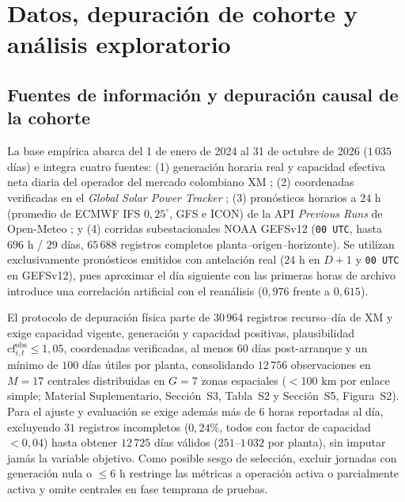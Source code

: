 \section{Datos, depuración de cohorte y análisis exploratorio}\label{sec:datos_eda}

\subsection{Fuentes de información y depuración causal de la cohorte}

La base empírica abarca del 1 de enero de 2024 al 31 de octubre de 2026 ($1\,035$ días) e integra cuatro fuentes: (1) generación horaria real y capacidad efectiva neta diaria del operador del mercado colombiano XM \cite{xm2026api}; (2) coordenadas verificadas en el \textit{Global Solar Power Tracker} \cite{gem2026solar}; (3) pronósticos horarios a $24\text{ h}$ (promedio de ECMWF IFS $0{,}25^\circ$, GFS e ICON) de la API \textit{Previous Runs} de Open-Meteo \cite{openmeteoPreviousRuns}; y (4) corridas subestacionales NOAA GEFSv12 (\texttt{00~UTC}, hasta $696\text{ h}$ / $29$ días, $65\,688$ registros completos planta--origen--horizonte). Se utilizan exclusivamente pronósticos emitidos con antelación real ($24\text{ h}$ en $D+1$ y \texttt{00~UTC} en GEFSv12), pues aproximar el día siguiente con las primeras horas de archivo introduce una correlación artificial con el reanálisis ($0{,}976$ frente a $0{,}615$).

El protocolo de depuración física \cite{nist2003eda,pipino2002quality,jensen2024solarqc} parte de $30\,964$ registros recurso--día de XM y exige capacidad vigente, generación y capacidad positivas, plausibilidad $\mathrm{cf}^{\mathrm{obs}}_{i,t} \le 1{,}05$, coordenadas verificadas, al menos $60$ días post-arranque y un mínimo de $100$ días útiles por planta, consolidando $12\,756$ observaciones en $M=17$ centrales distribuidas en $G=7$ zonas espaciales ($<100\text{ km}$ por enlace simple; Material Suplementario, Sección~S3, Tabla~S2 y Sección~S5, Figura~S2). Para el ajuste y evaluación se exige además más de $6$ horas reportadas al día, excluyendo $31$ registros incompletos ($0{,}24\%$, todos con factor de capacidad $< 0{,}04$) hasta obtener $12\,725$ días válidos ($251$--$1\,032$ por planta), sin imputar jamás la variable objetivo. Como posible sesgo de selección, excluir jornadas con generación nula o $\le 6\text{ h}$ restringe las métricas a operación activa o parcialmente activa y omite centrales en fase temprana de pruebas.


